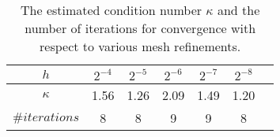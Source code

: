 \begin{table}
\begin{center}
\begin{tabular}{|c||c|c|c|c|c|c|}
\hline
$h$ & $2^{-4}$ & $2^{-5}$ & $2^{-6}$ & $2^{-7}$ & $2^{-8}$ \\ \hline 
$\kappa$ & 1.56 & 1.26 & 2.09 & 1.49 & 1.20 \\ \hline
$\#iterations$ & 8 & 8 & 9 & 9 & 8 \\ \hline 
\end{tabular}
\caption{The estimated condition number $\kappa$ and the number of iterations for 
  convergence with respect to various mesh refinements.}\label{tabel:neumann} 
\end{center}
\end{table}



